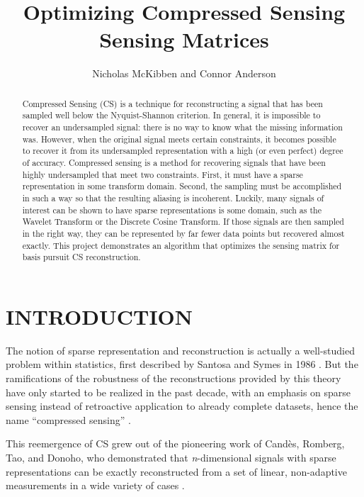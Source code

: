 \documentclass[journal]{IEEEtran}
\title{Optimizing Compressed Sensing Sensing Matrices}
\author{Nicholas McKibben and Connor Anderson}
\begin{document}
\maketitle
\thispagestyle{empty}
\pagestyle{empty}
\begin{abstract}

Compressed Sensing (CS) is a technique for reconstructing a signal that has been sampled well below the Nyquist-Shannon criterion.  In general, it is impossible to recover an undersampled signal: there is no way to know what the missing information was. However, when the original signal meets certain constraints, it becomes possible to recover it from its undersampled representation with a high (or even perfect) degree of accuracy. Compressed sensing is a method for recovering signals that have been highly undersampled that meet two constraints. First, it must have a sparse representation in some transform domain. Second, the sampling must be accomplished in such a way so that the resulting aliasing is incoherent. Luckily, many signals of interest can be shown to have sparse representations is some domain, such as the Wavelet Transform or the Discrete Cosine Transform. If those signals are then sampled in the right way, they can be represented by far fewer data points but recovered almost exactly.  This project demonstrates an algorithm that optimizes the sensing matrix for basis pursuit CS reconstruction.

\end{abstract}

\section{INTRODUCTION}

The notion of sparse representation and reconstruction is actually a well-studied problem within statistics, first described by Santosa and Symes in 1986 \cite{santosa}.  But the ramifications of the robustness of the reconstructions provided by this theory have only started to be realized in the past decade, with an emphasis on sparse sensing instead of retroactive application to already complete datasets, hence the name ``compressed sensing'' \cite{donoho}.

This reemergence of CS grew out of the pioneering work of Cand\`es, Romberg, Tao, and Donoho, who demonstrated that \emph{n}-dimensional signals with sparse representations can be exactly reconstructed from a set of linear, non-adaptive measurements in a wide variety of cases \cite{csbook,baraniuk,candes,donoho}.
\end{document}
